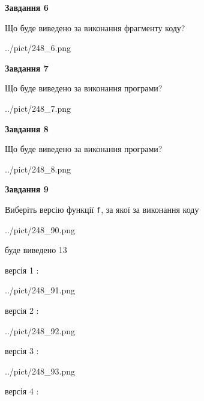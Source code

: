 \documentclass[12pt, ukrainian]{article}
\def\code#1{\Verb!#1!}
\begin{document}
{\begin {large}
{\begin {center}\textbf{Завдання 6}\end {center}}

Що буде виведено за виконання фрагменту коду?\par
\begin{center}
	{../pict/248_6.png}
\end{center}
\newpage

{\begin {center}\textbf{Завдання 7}\end {center}}

Що буде виведено за виконання програми?\par
\begin{center}
	{../pict/248_7.png}
\end{center}
\newpage

{\begin {center}\textbf{Завдання 8}\end {center}}

Що буде виведено за виконання програми?\par
\begin{center}
	{../pict/248_8.png}
\end{center}
\newpage

{\begin {center}\textbf{Завдання 9}\end {center}}

Виберіть версію функції \code{f}, за якої за виконання коду
\begin{center}
	{../pict/248_90.png}
\end{center}
буде виведено 13

\vspace{5mm}
версія 1 :

\begin{center}
	{../pict/248_91.png}
\end{center}
версія 2 :

\begin{center}
	{../pict/248_92.png}
\end{center}
версія 3 :

\begin{center}
	{../pict/248_93.png}
\end{center}
версія 4 :


\end{large}}
\end{document}
